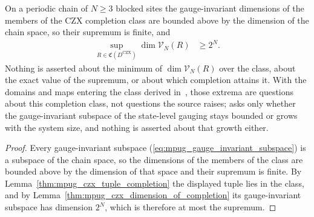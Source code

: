 \begin{lemma}
    \label{thm:mpug_czx_class_maximum}
    \leanok
    On a periodic chain of $N\geq3$ blocked sites the gauge-invariant
    dimensions of the members of the CZX completion class are bounded above by
    the dimension of the chain space, so their supremum is finite, and
    \begin{align}
        \sup_{R\in\mathfrak C(D^{\mathrm{CZX}})}\dim\mathcal V_N(R) & \geq2^N.
        \label{eq:mpug_czx_class_maximum}
    \end{align}
    Nothing is asserted about the minimum of $\dim\mathcal V_N(R)$ over the
    class, about the exact value of the supremum, or about which completion
    attains it. With the domains and maps entering the class derived
    in~\cite{gap:fbc25_czx_defect_domains}, those extrema are questions about
    this completion class, not questions the source raises;
    \cite[lines~5198--5204]{FrancoRubio2025MPUGauging} asks only whether the
    gauge-invariant subspace of the state-level gauging stays bounded or grows
    with the system size, and nothing is asserted about that growth either.
\end{lemma}

\begin{proof}\leanok
    Every gauge-invariant subspace (\ref{eq:mpug_gauge_invariant_subspace}) is
    a subspace of the chain space, so the dimensions of the members of the
    class are bounded above by the dimension of that space and their supremum
    is finite. By Lemma~\ref{thm:mpug_czx_tuple_completion} the displayed
    tuple lies in the class, and by
    Lemma~\ref{thm:mpug_czx_dimension_of_completion} its gauge-invariant
    subspace has dimension $2^N$, which is therefore at most the supremum.
\end{proof}


